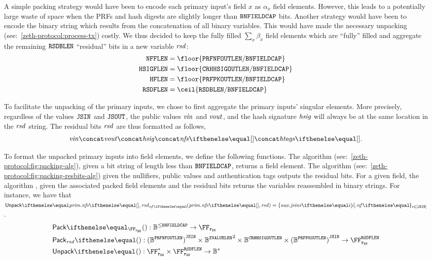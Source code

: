 A simple packing strategy would have been to encode each primary input's field $x$ as $\alpha_x$ field elements. However, this leads to a potentially large waste of space when the PRFs and hash digests are slightly longer than $\mathtt{BNFIELDCAP}$ bits. Another strategy would have been to encode the binary string which results from the concatenation of all binary variables. This would have made the necessary unpacking (see:~\cref{zeth-protocol:process-tx}) costly. We thus decided to keep the fully filled $\sum_x \beta_x$ field elements which are ``fully'' filled and aggregate the remaining $\mathtt{RSDBLEN}$ ``residual'' bits in a new variable $\mathit{rsd}$:
\begin{align*}
    \nfFLen &= \floor{\prfNfOutLen / \bnFieldBitCap} \\
    \hsigFLen &= \floor{\crhhsigOutLen / \bnFieldBitCap} \\
    \htagFLen &= \floor{\prfPkOutLen / \bnFieldBitCap} \\
    \resBitsFLen &= \ceil{\resBitsBLen / \bnFieldBitCap}
\end{align*}

To facilitate the unpacking of the primary inputs, we chose to first aggregate the primary inputs' singular elements. More precisely, regardless of the values $\mathtt{JSIN}$ and $\mathtt{JSOUT}$, the public values $\mathit{vin}$ and $\mathit{vout}$, and the hash signature $\mathit{hsig}$ will always be at the same location in the $\mathit{rsd}$ string. The residual bits $\mathit{rsd}$ are thus formatted as follows,
\[
    \vin \concat \vout \concat \hsig \concat \nfs{} \concat \htags{}.
\]
    
To format the unpacked primary inputs into field elements, we define the following functions. 
The algorithm \pack{}{} (see:~\cref{zeth-protocol:fig:packing-alg}), given a bit string of length less than $\mathtt{BNFIELDCAP}$, returns a field element. The algorithm \packResBits{}{} (see:~\cref{zeth-protocol:fig:packing-resbits-alg}) given the nullifiers, public values and authentication tags outputs the residual bits. For a given field, the algorithm \unpack{}{}, given the associated packed field elements and the residual bits returns the variables reassembled in binary strings. For instance, we have that $\unpack{\priminputs.\nfs{}, \resbits}{\nf{}} = \indexedset{\auxinputs.\jsins{i}.\nf{}}{i \in [\jsin]}$.
\begin{align*}
    &\pack{}{\FFx{\rBN}} : \BB^{\leq \bnFieldBitCap} \to \FFx{\rBN} \\
    &\packResBits{} : {(\BB^\prfNfOutLen)}^{\jsin} \times {\BB^\zvalueLen}^2 \times \BB^\crhhsigOutLen \times {(\BB^\prfPkOutLen)}^{\jsin} \to \FFx{\rBN}^\resBitsFLen \\
    &\unpack{}{} : \FFx{\rBN}^* \times \FFx{\rBN}^{\resBitsFLen} \to \BB^* \\
\end{align*}

